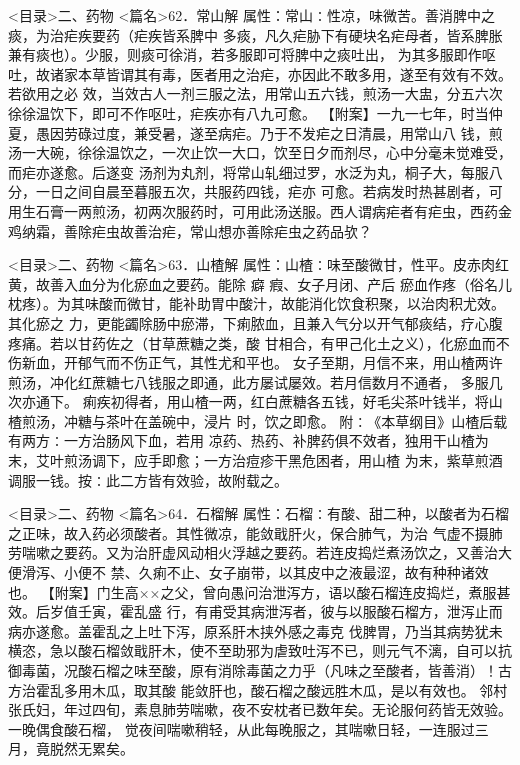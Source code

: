 \documentclass[a4paper,12pt,UTF8,twoside]{ctexbook}
\begin{document}
<目录>二、药物
<篇名>62．常山解
属性：常山∶性凉，味微苦。善消脾中之痰，为治疟疾要药（疟疾皆系脾中 
多痰，凡久疟胁下有硬块名疟母者，皆系脾胀兼有痰也）。少服，则痰可徐消，若多服即可将脾中之痰吐出， 
为其多服即作呕吐，故诸家本草皆谓其有毒，医者用之治疟，亦因此不敢多用，遂至有效有不效。若欲用之必 
效，当效古人一剂三服之法，用常山五六钱，煎汤一大盅，分五六次徐徐温饮下，即可不作呕吐，疟疾亦有八九可愈。 
【附案】一九一七年，时当仲夏，愚因劳碌过度，兼受暑，遂至病疟。乃于不发疟之日清晨，用常山八 
钱，煎汤一大碗，徐徐温饮之，一次止饮一大口，饮至日夕而剂尽，心中分毫未觉难受，而疟亦遂愈。后遂变 
汤剂为丸剂，将常山轧细过罗，水泛为丸，桐子大，每服八分，一日之间自晨至暮服五次，共服药四钱，疟亦 
可愈。若病发时热甚剧者，可用生石膏一两煎汤，初两次服药时，可用此汤送服。西人谓病疟者有疟虫，西药金 
鸡纳霜，善除疟虫故善治疟，常山想亦善除疟虫之药品欤？ 

<目录>二、药物
<篇名>63．山楂解
属性：山楂∶味至酸微甘，性平。皮赤肉红黄，故善入血分为化瘀血之要药。能除 癖 瘕、女子月闭、产后 
瘀血作疼（俗名儿枕疼）。为其味酸而微甘，能补助胃中酸汁，故能消化饮食积聚，以治肉积尤效。其化瘀之 
力，更能蠲除肠中瘀滞，下痢脓血，且兼入气分以开气郁痰结，疗心腹疼痛。若以甘药佐之（甘草蔗糖之类，酸 
甘相合，有甲己化土之义），化瘀血而不伤新血，开郁气而不伤正气，其性尤和平也。 
女子至期，月信不来，用山楂两许煎汤，冲化红蔗糖七八钱服之即通，此方屡试屡效。若月信数月不通者， 
多服几次亦通下。 
痢疾初得者，用山楂一两，红白蔗糖各五钱，好毛尖茶叶钱半，将山楂煎汤，冲糖与茶叶在盖碗中，浸片 
时，饮之即愈。 
附∶《本草纲目》山楂后载有两方∶一方治肠风下血，若用 
凉药、热药、补脾药俱不效者，独用干山楂为末，艾叶煎汤调下，应手即愈；一方治痘疹干黑危困者，用山楂 
为末，紫草煎酒调服一钱。按∶此二方皆有效验，故附载之。 

<目录>二、药物
<篇名>64．石榴解
属性：石榴∶有酸、甜二种，以酸者为石榴之正味，故入药必须酸者。其性微凉，能敛戢肝火，保合肺气，为治 
气虚不摄肺劳喘嗽之要药。又为治肝虚风动相火浮越之要药。若连皮捣烂煮汤饮之，又善治大便滑泻、小便不 
禁、久痢不止、女子崩带，以其皮中之液最涩，故有种种诸效也。 
【附案】门生高××之父，曾向愚问治泄泻方，语以酸石榴连皮捣烂，煮服甚效。后岁值壬寅，霍乱盛 
行，有甫受其病泄泻者，彼与以服酸石榴方，泄泻止而病亦遂愈。盖霍乱之上吐下泻，原系肝木挟外感之毒克 
伐脾胃，乃当其病势犹未横恣，急以酸石榴敛戢肝木，使不至助邪为虐致吐泻不已，则元气不漓，自可以抗 
御毒菌，况酸石榴之味至酸，原有消除毒菌之力乎（凡味之至酸者，皆善消）！古方治霍乱多用木瓜，取其酸 
能敛肝也，酸石榴之酸远胜木瓜，是以有效也。 
邻村张氏妇，年过四旬，素息肺劳喘嗽，夜不安枕者已数年矣。无论服何药皆无效验。一晚偶食酸石榴， 
觉夜间喘嗽稍轻，从此每晚服之，其喘嗽日轻，一连服过三月，竟脱然无累矣。 
\end{document}
